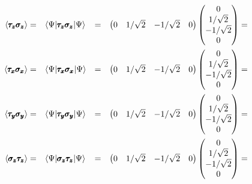 \documentclass[solutions.tex]{subfiles}
\begin{document}
\begin{equation*}\begin{aligned}
	\left\langle \pmb{\tau_z\sigma_z} \right\rangle &=&& \langle \Psi|\pmb{\tau_z\sigma_z}|\Psi\rangle
		&=&& \begin{pmatrix} 0 & 1/\sqrt2 & -1/\sqrt2 & 0\end{pmatrix}
		\begin{pmatrix}
			0 \\
			1/\sqrt2 \\
			-1/\sqrt2 \\
			0 \\
		\end{pmatrix} &=&&  \\
	\left\langle \pmb{\tau_x\sigma_x} \right\rangle &=&& \langle \Psi|\pmb{\tau_x\sigma_x}|\Psi\rangle
		&=&& \begin{pmatrix} 0 & 1/\sqrt2 & -1/\sqrt2 & 0\end{pmatrix}
		\begin{pmatrix}
			0 \\
			1/\sqrt2 \\
			-1/\sqrt2 \\
			0 \\
		\end{pmatrix} &=&&  \\
	\left\langle \pmb{\tau_y\sigma_y} \right\rangle &=&& \langle \Psi|\pmb{\tau_y\sigma_y}|\Psi\rangle
		&=&& \begin{pmatrix} 0 & 1/\sqrt2 & -1/\sqrt2 & 0\end{pmatrix}
		\begin{pmatrix}
			0 \\
			1/\sqrt2 \\
			-1/\sqrt2 \\
			0 \\
		\end{pmatrix} &=&&  \\
	\left\langle \pmb{\sigma_z\tau_z} \right\rangle &=&& \langle \Psi|\pmb{\sigma_z\tau_z}|\Psi\rangle
		&=&& \begin{pmatrix} 0 & 1/\sqrt2 & -1/\sqrt2 & 0\end{pmatrix}
		\begin{pmatrix}
			0 \\
			1/\sqrt2 \\
			-1/\sqrt2 \\
			0 \\
		\end{pmatrix} &=&&  \\
\end{aligned}\end{equation*}
\end{document}
